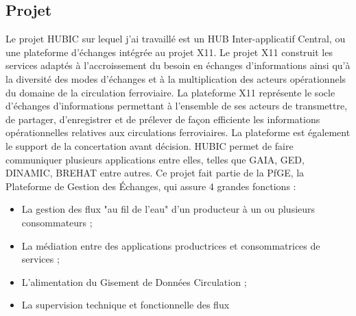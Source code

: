 \subsection {Projet}
Le projet HUBIC sur lequel j'ai travaillé est un HUB Inter-applicatif Central, ou une plateforme
d'échanges intégrée au projet X11.
Le projet X11 construit les services adaptés à l'accroissement du besoin en échanges d'informations
ainsi qu'à la diversité des modes d'échanges et à la multiplication des acteurs opérationnels
du domaine de la circulation ferroviaire. La plateforme X11 représente le socle d'échanges d'informations
permettant à l'ensemble de ses acteurs de transmettre, de partager, d'enregistrer et
de prélever de façon efficiente les informations opérationnelles relatives aux circulations ferroviaires.
La plateforme est également le support de la concertation avant décision.
HUBIC permet de faire communiquer plusieurs applications entre elles, telles que GAIA, GED,
DINAMIC, BREHAT entre autres. Ce projet fait partie de la PfGE, la Plateforme de Gestion
des Échanges, qui assure 4 grandes fonctions :
\begin{itemize}
	\item La gestion des flux "au fil de l'eau" d'un producteur à un ou plusieurs consommateurs ;
	\item La médiation entre des applications productrices et consommatrices de services ;
	\item L'alimentation du Gisement de Données Circulation ;
	\item La supervision technique et fonctionnelle des flux 
\end{itemize}

